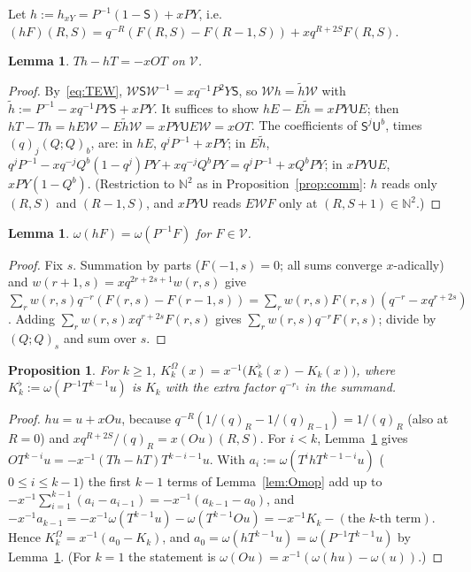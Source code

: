 \documentclass[11pt]{amsart}
\newtheorem{proposition}[theorem]{Proposition}
\newtheorem{lemma}[theorem]{Lemma}
\theoremstyle{definition}
\numberwithin{equation}{section}
\newcommand{\N}{\mathbb{N}}
\begin{document}
Let $h:=h_{xY}=P^{-1}(1-\mathsf S)+xPY$, i.e.\ $(hF)(R,S)=q^{-R}(F(R,S)-F(R-1,S))+xq^{R+2S}F(R,S)$.

\begin{lemma}\label{lem:hcomm}
$Th-hT=-xOT$ on $\mathcal V$.
\end{lemma}
\begin{proof}
By~\eqref{eq:TEW}, $\mathcal W\mathsf S\mathcal W^{-1}=xq^{-1}P^2Y\mathsf S$, so $\mathcal Wh=\tilde h\mathcal W$ with
$\tilde h:=P^{-1}-xq^{-1}PY\mathsf S+xPY$. It suffices to show $hE-E\tilde h=xPY\mathsf UE$; then
$hT-Th=hE\mathcal W-E\tilde h\mathcal W=xPY\mathsf UE\mathcal W=xOT$. The coefficients of $\mathsf S^j\mathsf U^b$, times
$(q)_j(Q;Q)_b$, are: in $hE$, $q^jP^{-1}+xPY$; in $E\tilde h$, $q^jP^{-1}-xq^{-j}Q^b(1-q^j)PY+xq^{-j}Q^bPY=q^jP^{-1}+xQ^bPY$;
in $xPY\mathsf UE$, $xPY(1-Q^b)$. (Restriction to $\N^2$ as in Proposition~\ref{prop:comm}: $h$ reads only $(R,S)$ and
$(R-1,S)$, and $xPY\mathsf U$ reads $E\mathcal WF$ only at $(R,S+1)\in\N^2$.)
\end{proof}

\begin{lemma}\label{lem:omh}
$\omega(hF)=\omega(P^{-1}F)$ for $F\in\mathcal V$.
\end{lemma}
\begin{proof}
Fix $s$. Summation by parts ($F(-1,s)=0$; all sums converge $x$-adically) and $w(r+1,s)=xq^{2r+2s+1}w(r,s)$ give
$\sum_rw(r,s)q^{-r}(F(r,s)-F(r-1,s))=\sum_rw(r,s)F(r,s)(q^{-r}-xq^{r+2s})$. Adding $\sum_rw(r,s)xq^{r+2s}F(r,s)$ gives
$\sum_rw(r,s)q^{-r}F(r,s)$; divide by $(Q;Q)_s$ and sum over $s$.
\end{proof}

\begin{proposition}\label{prop:tele}
For $k\ge1$, $K^\Omega_k(x)=x^{-1}\bigl(K^\flat_k(x)-K_k(x)\bigr)$, where $K^\flat_k:=\omega(P^{-1}T^{k-1}u)$ is $K_k$ with the
extra factor $q^{-r_1}$ in the summand.
\end{proposition}
\begin{proof}
$hu=u+xOu$, because $q^{-R}(1/(q)_R-1/(q)_{R-1})=1/(q)_R$ (also at $R=0$) and $xq^{R+2S}/(q)_R=x(Ou)(R,S)$. For $i<k$,
Lemma~\ref{lem:hcomm} gives $OT^{k-i}u=-x^{-1}(Th-hT)T^{k-i-1}u$. With $a_i:=\omega(T^ihT^{k-1-i}u)$ ($0\le i\le k-1$) the first
$k-1$ terms of Lemma~\ref{lem:Omop} add up to $-x^{-1}\sum_{i=1}^{k-1}(a_i-a_{i-1})=-x^{-1}(a_{k-1}-a_0)$, and
$-x^{-1}a_{k-1}=-x^{-1}\omega(T^{k-1}u)-\omega(T^{k-1}Ou)=-x^{-1}K_k-(\text{the $k$-th term})$. Hence
$K^\Omega_k=x^{-1}(a_0-K_k)$, and $a_0=\omega(hT^{k-1}u)=\omega(P^{-1}T^{k-1}u)$ by Lemma~\ref{lem:omh}. (For $k=1$ the
statement is $\omega(Ou)=x^{-1}(\omega(hu)-\omega(u))$.)
\end{proof}
\end{document}
